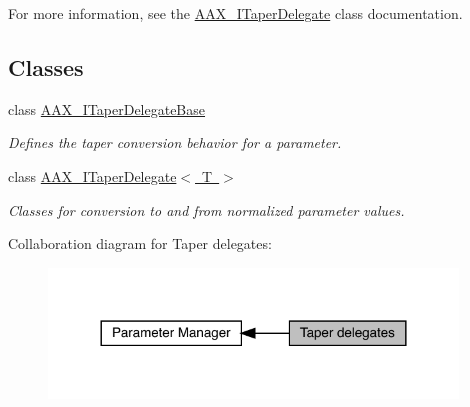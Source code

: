 For more information, see the \mbox{\hyperlink{a01881}{A\+A\+X\+\_\+\+I\+Taper\+Delegate}} class documentation. \subsection*{Classes}
\begin{DoxyCompactItemize}
\item 
class \mbox{\hyperlink{a01877}{A\+A\+X\+\_\+\+I\+Taper\+Delegate\+Base}}
\begin{DoxyCompactList}\small\item\em Defines the taper conversion behavior for a parameter. \end{DoxyCompactList}\item 
class \mbox{\hyperlink{a01881}{A\+A\+X\+\_\+\+I\+Taper\+Delegate$<$ T $>$}}
\begin{DoxyCompactList}\small\item\em Classes for conversion to and from normalized parameter values. \end{DoxyCompactList}\end{DoxyCompactItemize}
Collaboration diagram for Taper delegates\+:
\nopagebreak
\begin{figure}[H]
\begin{center}
\leavevmode
\includegraphics[width=308pt]{a00815}
\end{center}
\end{figure}
